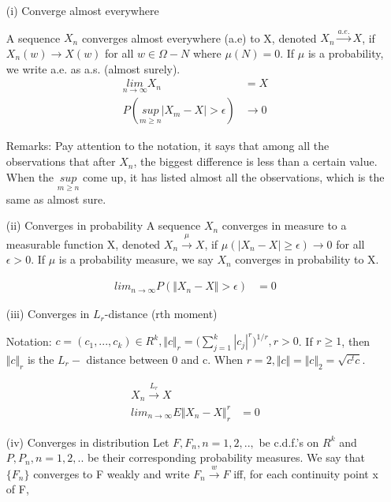 \documentclass[11pt]{article} %
\begin{document}
\begin{itemize}
	\item [(i)] Converge almost everywhere
	
	A sequence $X_n$ converges almost everywhere (a.e) to X, denoted $X_n \xrightarrow {a.e.} X $, if $X_n(w) \rightarrow X(w)$ for all $w \in \Omega - N$ where $\mu(N) = 0$. If $\mu$ is a probability, we write a.e. as a.s. (almost surely). 
\begin{align*}
	\underset{n \rightarrow \infty}{lim} X_n &= X \\
	P(\underset{m \geq n}{sup} \Big | X_m - X \Big | > \epsilon) & \rightarrow 0
\end{align*}
	
Remarks: Pay attention to the notation, it says that among all the observations that after $X_n$, the biggest difference is less than a certain value. When the $\underset{m \geq n}{sup}$ come up, it has listed almost all the observations, which is the same as almost sure. 
	
	\item[(ii)] Converges in probability
A sequence $X_n$ converges in measure to a measurable function X, denoted $X_n \xrightarrow {\mu} X$, if $\mu(|X_n - X| \geq \epsilon) \rightarrow 0$ for all $\epsilon > 0$. If $\mu$ is a probability measure, we say $X_n$ converges in probability to X.

\begin{align*}
	lim_{n \rightarrow \infty} P(\Vert X_n -X \Vert > \epsilon)&= 0
\end{align*}

\item[(iii)] Converges in $L_r$-distance (rth moment)

Notation: $c= (c_1, ... , c_k) \in R^k, \Vert c \Vert_r = \Big( \sum_{j=1}^k | c_j |^r \Big)^{1/r}, r> 0$. If $r \geq 1$, then $\Vert  c \Vert_r $ is the $L_r-$ distance between 0 and c. When $r= 2, \Vert  c \Vert = \Vert c \Vert _2 = \sqrt{c^t c}$.

\begin{align*}
	X_n \xrightarrow {L_r} X \\
	lim_{n \rightarrow \infty} E \Vert  X_n -X \Vert _{r}^{r}&= 0
\end{align*}

\item[(iv)] Converges in distribution
Let $F, F_n, n= 1,2,..,$ be c.d.f.'s on $R^k$ and $P, P_n, n=1,2,..$ be their corresponding probability measures. 
We say that $\{ F_n\}$ converges to F weakly and write $F_n \xrightarrow {w} F$ iff, for each continuity point x of F, 


\end{itemize}
\end{document}
